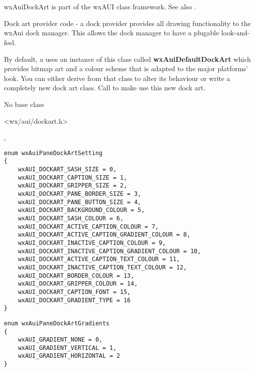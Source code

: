 %
%

\section{}\label{wxauidockart}

wxAuiDockArt is part of the wxAUI class framework.
See also .

Dock art provider code - a dock provider provides all drawing
functionality to the wxAui dock manager. This allows the dock
manager to have a plugable look-and-feel.

By default, a  uses an
instance of this class called {\bf wxAuiDefaultDockArt} which
provides bitmap art and a colour scheme that is adapted to
the major platforms' look. You can either derive from that
class to alter its behaviour or write a completely new dock
art class. Call 
to make use this new dock art.


No base class


<wx/aui/dockart.h>


,


\begin{verbatim}
enum wxAuiPaneDockArtSetting
{
    wxAUI_DOCKART_SASH_SIZE = 0,
    wxAUI_DOCKART_CAPTION_SIZE = 1,
    wxAUI_DOCKART_GRIPPER_SIZE = 2,
    wxAUI_DOCKART_PANE_BORDER_SIZE = 3,
    wxAUI_DOCKART_PANE_BUTTON_SIZE = 4,
    wxAUI_DOCKART_BACKGROUND_COLOUR = 5,
    wxAUI_DOCKART_SASH_COLOUR = 6,
    wxAUI_DOCKART_ACTIVE_CAPTION_COLOUR = 7,
    wxAUI_DOCKART_ACTIVE_CAPTION_GRADIENT_COLOUR = 8,
    wxAUI_DOCKART_INACTIVE_CAPTION_COLOUR = 9,
    wxAUI_DOCKART_INACTIVE_CAPTION_GRADIENT_COLOUR = 10,
    wxAUI_DOCKART_ACTIVE_CAPTION_TEXT_COLOUR = 11,
    wxAUI_DOCKART_INACTIVE_CAPTION_TEXT_COLOUR = 12,
    wxAUI_DOCKART_BORDER_COLOUR = 13,
    wxAUI_DOCKART_GRIPPER_COLOUR = 14,
    wxAUI_DOCKART_CAPTION_FONT = 15,
    wxAUI_DOCKART_GRADIENT_TYPE = 16
}
\end{verbatim}

\begin{verbatim}
enum wxAuiPaneDockArtGradients
{
    wxAUI_GRADIENT_NONE = 0,
    wxAUI_GRADIENT_VERTICAL = 1,
    wxAUI_GRADIENT_HORIZONTAL = 2
}
\end{verbatim}

